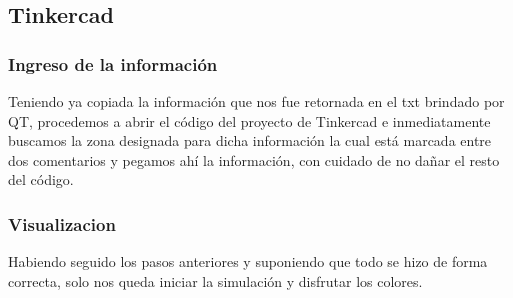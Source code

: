 \documentclass{article}
\begin{document}
    \begin{flushleft}
    \subsection{Tinkercad}
    \subsubsection{Ingreso de la información}
    Teniendo ya copiada la información que nos fue retornada en el txt brindado por QT, procedemos a abrir el código del proyecto de Tinkercad e inmediatamente buscamos la zona designada para dicha información la cual está marcada entre dos comentarios y pegamos ahí la información, con cuidado de no dañar el resto del código.
    
    \subsubsection{Visualizacion}
    Habiendo seguido los pasos anteriores y suponiendo que todo se hizo de forma correcta, solo nos queda iniciar la simulación y disfrutar los colores.  
    \end{flushleft}

\vfill

\end{document}
